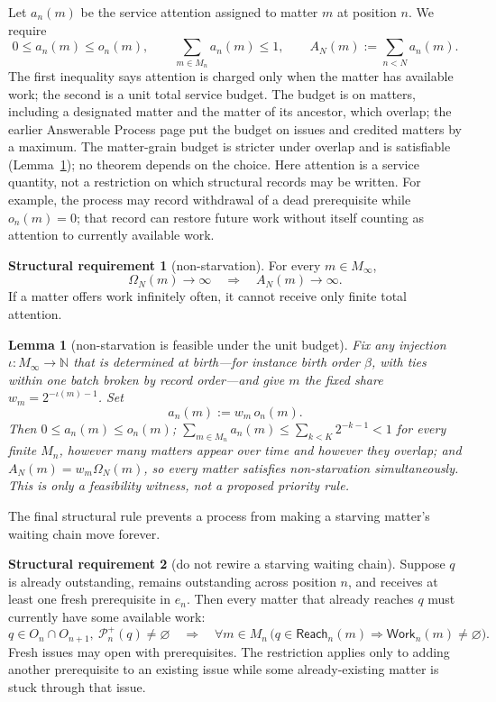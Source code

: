 \documentclass[11pt]{article}
\newtheorem{lemma}{Lemma}
\theoremstyle{definition}
\newtheorem{requirement}{Structural requirement}
\theoremstyle{remark}
\newcommand{\Pre}{\mathcal P}
\newcommand{\Reach}{\mathsf{Reach}}
\newcommand{\Work}{\mathsf{Work}}
\begin{document}
Let $a_n(m)$ be the service attention assigned to matter $m$ at position $n$.
We require
\[
 0\le a_n(m)\le o_n(m),
 \qquad
 \sum_{m\in M_n}a_n(m)\le 1,
 \qquad
 A_N(m):=\sum_{n<N}a_n(m).
\]
The first inequality says attention is charged only when the matter has
available work; the second is a unit total service budget. The budget is on matters, including a designated
matter and the matter of its ancestor, which overlap; the earlier Answerable
Process page put the budget on issues and credited matters by a maximum. The
matter-grain budget is stricter under overlap and is satisfiable
(Lemma~\ref{lem:nonstarve-feasible}); no theorem depends on the choice. Here
attention is a service quantity, not a restriction on which structural records
may be written.
For example, the process may record withdrawal of a dead prerequisite while
$o_n(m)=0$; that record can restore future work without itself counting as
attention to currently available work.

\begin{requirement}[non-starvation]\label{req:nonstarvation}
For every $m\in M_\infty$,
\[
 \Omega_N(m)\to\infty
 \quad\Longrightarrow\quad
 A_N(m)\to\infty.
\]
If a matter offers work infinitely often, it cannot receive only finite total
attention.
\end{requirement}

\begin{lemma}[non-starvation is feasible under the unit budget]\label{lem:nonstarve-feasible}
Fix any injection $\iota:M_\infty\to\mathbb N$ that is determined at birth---for
instance birth order $\beta$, with ties within one batch broken by record
order---and give $m$ the fixed share $w_m=2^{-\iota(m)-1}$. Set
\[
 a_n(m):=w_m\,o_n(m).
\]
Then $0\le a_n(m)\le o_n(m)$; $\sum_{m\in M_n}a_n(m)\le\sum_{k<K}2^{-k-1}<1$
for every finite $M_n$, however many matters appear over time and however they
overlap; and $A_N(m)=w_m\Omega_N(m)$, so every matter satisfies non-starvation
simultaneously. This is only a feasibility witness, not a proposed priority
rule.
\end{lemma}

The final structural rule prevents a process from making a starving matter's
waiting chain move forever.

\begin{requirement}[do not rewire a starving waiting chain]\label{req:no-rewire}
Suppose $q$ is already outstanding, remains outstanding across position $n$,
and receives at least one fresh prerequisite in $e_n$. Then every matter that
already reaches $q$ must currently have some available work:
\[
 q\in O_n\cap O_{n+1},\ \Pre_n^+(q)\neq\varnothing
 \quad\Longrightarrow\quad
 \forall m\in M_n\,
 \bigl(q\in\Reach_n(m)\Rightarrow\Work_n(m)\neq\varnothing\bigr).
\]
Fresh issues may open with prerequisites. The restriction applies only to
adding another prerequisite to an existing issue while some already-existing
matter is stuck through that issue.
\end{requirement}
\end{document}
